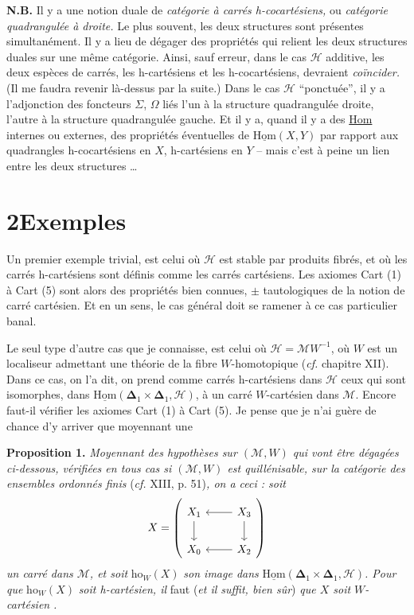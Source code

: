 \documentclass[11pt]{article}
\newcommand{\printedpage}[1]{\if\relax\detokenize{#1}\relax\else\begingroup\reversemarginpar\marginnote{\footnotesize p.~#1}\endgroup\fi}
\newcommand{\msp}[1]{\marginnote{\footnotesize [#1]}}
\newcommand{\uHom}{\underline{\mathrm{Hom}}}
\newcommand{\bDelta}{\mathbf{\Delta}}
\newcommand{\ho}{\mathrm{ho}}
\begin{document}
\printedpage{6}

\msp{page 7}
\textbf{N.B.} Il y a une notion duale de \textit{catégorie à carrés h-cocartésiens,} ou \textit{catégorie quadrangulée à droite.} Le plus souvent, les deux structures sont présentes simultanément. Il y a lieu de dégager des propriétés qui relient les deux structures duales sur une même catégorie. Ainsi, sauf erreur, dans le cas $\mathcal{H}$ additive, les deux espèces de carrés, les h-cartésiens et les h-cocartésiens, devraient \textit{coïncider.} (Il me faudra revenir là-dessus par la suite.) Dans le cas $\mathcal{H}$ ``ponctuée'', il y a l'adjonction des foncteurs $\Sigma$, $\Omega$ liés l'un à la structure quadrangulée droite, l'autre à la structure quadrangulée gauche. Et il y a, quand il y a des \underline{Hom} internes ou externes, des propriétés éventuelles de $\uHom(X,Y)$ par rapport aux quadrangles h-cocartésiens en $X$, h-cartésiens en $Y$ -- mais c'est à peine un lien entre les deux structures \ldots

\section*{2\quad Exemples}

Un premier exemple trivial, est celui où $\mathcal{H}$ est stable par produits fibrés, et où les carrés h-cartésiens sont définis comme les carrés cartésiens. Les axiomes Cart (1) à Cart (5) sont alors des propriétés bien connues, $\pm$ tautologiques de la notion de carré cartésien. Et
\msp{page 8}
en un sens, le cas général doit se ramener à ce cas particulier banal.

Le seul type d'autre cas que je connaisse, est celui où $\mathcal{H} = \mathcal{M}W^{-1}$, où $W$ est un localiseur admettant une théorie de la fibre $W$-homotopique (\textit{cf.} chapitre XII). Dans ce cas, on l'a dit, on prend comme carrés h-cartésiens dans $\mathcal{H}$ ceux qui sont isomorphes, dans $\uHom(\bDelta_1 \times \bDelta_1, \mathcal{H})$, à un carré $W$-cartésien dans $\mathcal{M}$. Encore faut-il vérifier les axiomes Cart (1) à Cart (5). Je pense que je n'ai guère de chance d'y arriver que moyennant une

\textbf{Proposition 1.} \textit{Moyennant des hypothèses sur $(\mathcal{M}, W)$ qui vont être dégagées ci-dessous, vérifiées en tous cas si $(\mathcal{M}, W)$ est quillénisable, sur la catégorie des ensembles ordonnés finis} (\textit{cf.} XIII, p. 51)\textit{, on a ceci : soit}
\[
X = \left(\begin{tikzcd}
X_1 \ar[d] & X_3 \ar[l] \ar[d] \\
X_0 & X_2 \ar[l]
\end{tikzcd}\right)
\]
\textit{un carré dans $\mathcal{M}$, et soit} $\ho_W(X)$ \textit{son image dans} $\uHom(\bDelta_1 \times \bDelta_1, \mathcal{H})$\textit{. Pour que} $\ho_W(X)$ \textit{soit h-cartésien, il} faut (\textit{et il suffit, bien sûr}) \textit{que $X$ soit $W$-cartésien} \textit{.}

\printedpage{7}

\end{document}
